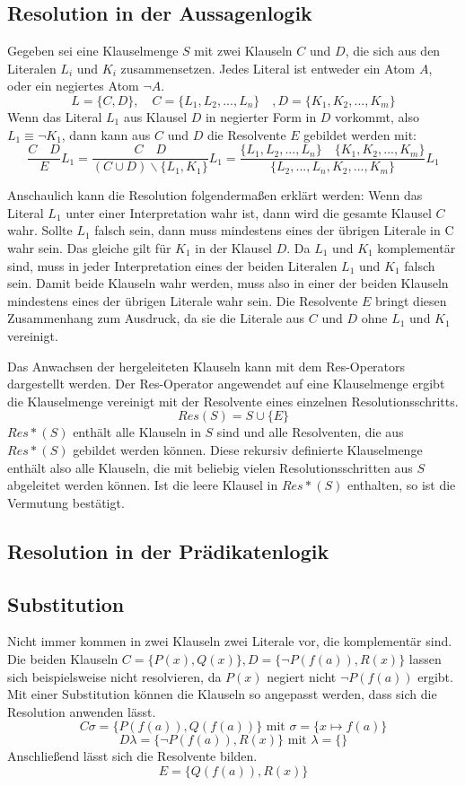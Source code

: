 		\subsection{Resolution in der Aussagenlogik}
Gegeben sei eine Klauselmenge $S$ mit zwei Klauseln $C$ und $D$, die sich aus den Literalen $L_i$ und $K_i$ zusammensetzen. Jedes Literal ist entweder ein Atom $A$, oder ein negiertes Atom $\neg A$.
$$L=\{C,D\}, \quad C=\{L_1, L_2, ..., L_n\}\quad, D=\{K_1, K_2, ..., K_m\}$$
Wenn das Literal $L_1$ aus Klausel $D$ in negierter Form in $D$ vorkommt, also $L_1\equiv\neg K_1$, dann kann aus $C$ und $D$ die Resolvente $E$ gebildet werden mit:
$$\frac{C\quad D}{E}L_1=\frac{C \quad D}{(C \cup D) \backslash \{L_1, K_1\}}L_1
= \frac{\{L_1, L_2, ..., L_n\}\quad\{K_1, K_2, ..., K_m\}}{\{L_2, ..., L_n, K_2, ..., K_m\}}L_1$$

Anschaulich kann die Resolution folgendermaßen erklärt werden: 
Wenn das Literal $L_1$ unter einer Interpretation wahr ist, dann wird die gesamte Klausel $C$ wahr. Sollte $L_1$ falsch sein, dann muss mindestens eines der übrigen Literale in C wahr sein.
Das gleiche gilt für $K_1$ in der Klausel $D$.
Da $L_1$ und $K_1$ komplementär sind, muss in jeder Interpretation eines der beiden Literalen $L_1$ und $K_1$ falsch sein. Damit beide Klauseln wahr werden, muss also in einer der beiden Klauseln mindestens eines der übrigen Literale wahr sein. Die Resolvente $E$ bringt diesen Zusammenhang zum Ausdruck, da sie die Literale aus $C$ und $D$ ohne $L_1$ und $K_1$ vereinigt.

Das Anwachsen der hergeleiteten Klauseln kann mit dem Res-Operators dargestellt werden. Der Res-Operator angewendet auf eine Klauselmenge ergibt die Klauselmenge vereinigt mit der Resolvente eines einzelnen Resolutionsschritts.
$$Res(S)=S \cup \{E\}$$
$Res*(S)$ enthält alle Klauseln in $S$ sind und alle Resolventen, die aus $Res*(S)$ gebildet werden können. Diese rekursiv definierte Klauselmenge enthält also alle Klauseln, die mit beliebig vielen Resolutionsschritten aus $S$ abgeleitet werden können. Ist die leere Klausel in $Res*(S)$ enthalten, so ist die Vermutung bestätigt.
		\subsection{Resolution in der Prädikatenlogik}
		
		\subsection{Substitution}
Nicht immer kommen in zwei Klauseln zwei Literale vor, die komplementär sind. Die beiden Klauseln $C=\{P(x), Q(x)\}, D=\{\neg P(f(a)), R(x)\}$ lassen sich beispielsweise nicht resolvieren, da $P(x)$ negiert nicht $\neg P(f(a))$ ergibt.
Mit einer Substitution können die Klauseln so angepasst werden, dass sich die Resolution anwenden lässt.
$$C\sigma=\{P(f(a)), Q(f(a))\} \text{ mit } \sigma=\{x \mapsto f(a)\}$$
$$D\lambda=\{\neg P(f(a)), R(x)\} \text{ mit } \lambda=\{\}$$
Anschließend lässt sich die Resolvente bilden.
$$E=\{Q(f(a)), R(x)\}$$
